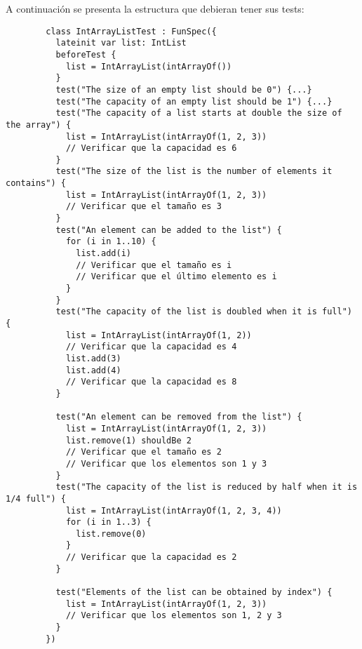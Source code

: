 \begin{Exercise}
    \ExeText A continuación se presenta la estructura que debieran tener sus tests:
      \begin{verbatim}
        class IntArrayListTest : FunSpec({
          lateinit var list: IntList
          beforeTest {
            list = IntArrayList(intArrayOf())
          }
          test("The size of an empty list should be 0") {...}
          test("The capacity of an empty list should be 1") {...}
          test("The capacity of a list starts at double the size of the array") {
            list = IntArrayList(intArrayOf(1, 2, 3))
            // Verificar que la capacidad es 6
          }
          test("The size of the list is the number of elements it contains") {
            list = IntArrayList(intArrayOf(1, 2, 3))
            // Verificar que el tamaño es 3
          }
          test("An element can be added to the list") {
            for (i in 1..10) {
              list.add(i)
              // Verificar que el tamaño es i
              // Verificar que el último elemento es i
            }
          }
          test("The capacity of the list is doubled when it is full") {
            list = IntArrayList(intArrayOf(1, 2))
            // Verificar que la capacidad es 4
            list.add(3)
            list.add(4)
            // Verificar que la capacidad es 8
          }

          test("An element can be removed from the list") {
            list = IntArrayList(intArrayOf(1, 2, 3))
            list.remove(1) shouldBe 2
            // Verificar que el tamaño es 2
            // Verificar que los elementos son 1 y 3
          }
          test("The capacity of the list is reduced by half when it is 1/4 full") {
            list = IntArrayList(intArrayOf(1, 2, 3, 4))
            for (i in 1..3) {
              list.remove(0)
            }
            // Verificar que la capacidad es 2
          }

          test("Elements of the list can be obtained by index") {
            list = IntArrayList(intArrayOf(1, 2, 3))
            // Verificar que los elementos son 1, 2 y 3
          }
        })
      \end{verbatim}
  \end{Exercise}